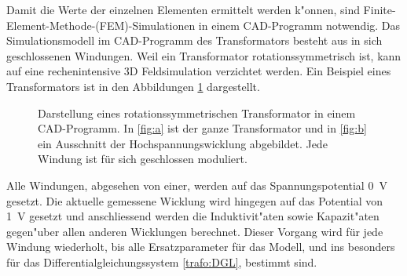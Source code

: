 \begin{refsection}
Damit die Werte der einzelnen Elementen ermittelt werden k"onnen, sind Finite-Element-Methode-(FEM)-Simulationen in einem CAD-Programm notwendig. Das Simulationsmodell im CAD-Programm des Transformators besteht aus in sich geschlossenen Windungen. Weil ein Transformator rotationssymmetrisch ist, kann auf eine rechenintensive 3D Feldsimulation verzichtet werden. Ein Beispiel eines Transformators ist in den Abbildungen \ref{trafo:infolytica} dargestellt.

\begin{figure}
	\centering    
	\caption{Darstellung eines rotationssymmetrischen Transformator in einem CAD-Programm. In \ref{fig:a} ist der ganze Transformator und in \ref{fig:b} ein Ausschnitt der Hochspannungswicklung abgebildet. Jede Windung ist für sich geschlossen moduliert.}
	\label{trafo:infolytica}
\end{figure}

Alle Windungen, abgesehen von einer, werden auf das Spannungspotential \SI{0}{\volt} gesetzt. Die aktuelle gemessene Wicklung wird hingegen auf das Potential von \SI{1}{\volt} gesetzt und anschliessend werden die Induktivit"aten sowie Kapazit"aten gegen"uber allen anderen Wicklungen berechnet. Dieser Vorgang wird für jede Windung wiederholt, bis alle Ersatzparameter für das Modell, und ins besonders für das Differentialgleichungssystem \ref{trafo:DGL}, bestimmt sind.


\end{refsection}
